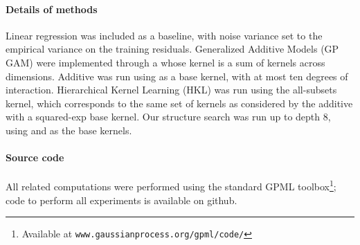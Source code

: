 \documentclass[twoside]{article}
\begin{document}
\paragraph{Details of methods}

Linear regression was included as a baseline, with noise variance set to the empirical variance on the training residuals.
%
Generalized Additive Models (GP GAM) were implemented through a \gp{} whose kernel is a sum of \kSE{} kernels across dimensions.
%
Additive \gp{} was run using \kSE{} as a base kernel, with at most ten degrees of interaction.
%
Hierarchical Kernel Learning (HKL)
was run using the all-subsets kernel, which corresponds to the same set of kernels as considered by the additive \gp{} with a squared-exp base kernel.
%
Our structure search was run up to depth 8, using \kSE{} and \kRQ{} as the base kernels.


\paragraph{Source code}All \gp{} related computations were performed using the standard GPML toolbox\footnote{Available at \texttt{www.gaussianprocess.org/gpml/code/}}; code to perform all experiments is available on github.


\end{document}
